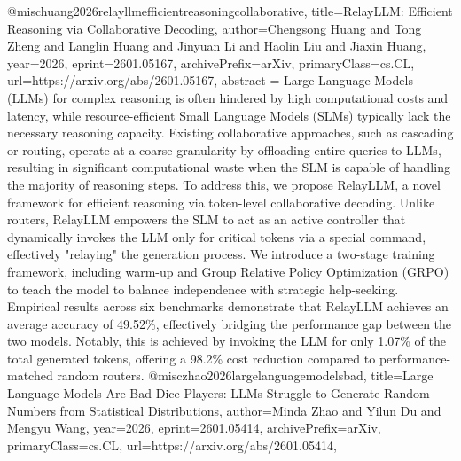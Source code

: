 {}@misc{huang2026relayllmefficientreasoningcollaborative,
      title={RelayLLM: Efficient Reasoning via Collaborative Decoding}, 
      author={Chengsong Huang and Tong Zheng and Langlin Huang and Jinyuan Li and Haolin Liu and Jiaxin Huang},
      year={2026},
      eprint={2601.05167},
      archivePrefix={arXiv},
      primaryClass={cs.CL},
      url={https://arxiv.org/abs/2601.05167},
      abstract = {Large Language Models (LLMs) for complex reasoning is often hindered by high computational costs and latency, while resource-efficient Small Language Models (SLMs) typically lack the necessary reasoning capacity. Existing collaborative approaches, such as cascading or routing, operate at a coarse granularity by offloading entire queries to LLMs, resulting in significant computational waste when the SLM is capable of handling the majority of reasoning steps. To address this, we propose RelayLLM, a novel framework for efficient reasoning via token-level collaborative decoding. Unlike routers, RelayLLM empowers the SLM to act as an active controller that dynamically invokes the LLM only for critical tokens via a special command, effectively "relaying" the generation process. We introduce a two-stage training framework, including warm-up and Group Relative Policy Optimization (GRPO) to teach the model to balance independence with strategic help-seeking. Empirical results across six benchmarks demonstrate that RelayLLM achieves an average accuracy of 49.52\%, effectively bridging the performance gap between the two models. Notably, this is achieved by invoking the LLM for only 1.07\% of the total generated tokens, offering a 98.2\% cost reduction compared to performance-matched random routers.}
}@misc{zhao2026largelanguagemodelsbad,
      title={Large Language Models Are Bad Dice Players: LLMs Struggle to Generate Random Numbers from Statistical Distributions}, 
      author={Minda Zhao and Yilun Du and Mengyu Wang},
      year={2026},
      eprint={2601.05414},
      archivePrefix={arXiv},
      primaryClass={cs.CL},
      url={https://arxiv.org/abs/2601.05414},
}
